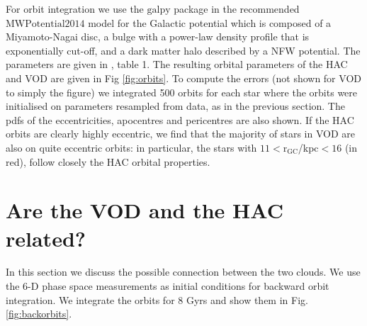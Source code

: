 \documentclass[fleqn,usenatbib]{mnras}
\begin{document}
For orbit integration we use the $\mathrm{galpy}$ package \citet{Bovy2015} in the recommended  $\mathrm{MWPotential2014}$ model for the Galactic potential which is composed of a Miyamoto-Nagai disc, a bulge with a power-law density profile that is exponentially cut-off, and a dark matter halo described by a NFW potential. The parameters are given in \citet{Bovy2015}, table 1. The resulting orbital parameters of the HAC and VOD are given in Fig \ref{fig:orbits}. To compute the errors (not shown for VOD to simply the figure) we integrated 500 orbits for each star where the orbits were initialised on parameters resampled from data, as in the previous section. The pdfs of the eccentricities, apocentres and pericentres are also shown.
If the HAC orbits are clearly highly eccentric, we find that the majority of stars in VOD are also on quite eccentric orbits: in particular, the stars with $11<\mathrm{r_{GC}}$/kpc$<16$ (in red), follow closely the HAC orbital properties.
%
\section{Are the VOD and the HAC related?}
In this section we discuss the possible connection between the two clouds. 
We use the 6-D phase space measurements as initial conditions for backward orbit integration. We integrate the orbits for 8 Gyrs %
and show them in Fig. \ref{fig:backorbits}.
\end{document}
